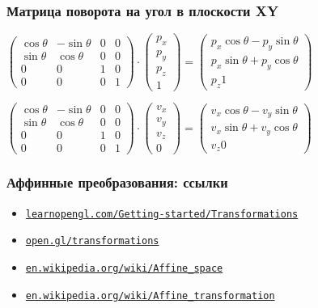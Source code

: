 \documentclass{beamer}
\begin{document}
\begin{frame}[fragile]
\frametitle{Матрица поворота на угол в плоскости XY}
\begin{center}
\begin{math}
\begin{pmatrix}
\cos \theta & - \sin \theta & 0 & 0 \\
\sin \theta & \cos \theta & 0 & 0 \\
0 & 0 & 1 & 0 \\
0 & 0 & 0 & 1
\end{pmatrix}
\cdot
\begin{pmatrix}
p_x \\
p_y \\
p_z \\
1
\end{pmatrix}
=
\begin{pmatrix}
p_x \cos \theta - p_y \sin \theta \\
p_x \sin \theta + p_y \cos \theta \\
p_z
1
\end{pmatrix}
\end{math}

\begin{math}
\begin{pmatrix}
\cos \theta & - \sin \theta & 0 & 0 \\
\sin \theta & \cos \theta & 0 & 0 \\
0 & 0 & 1 & 0 \\
0 & 0 & 0 & 1
\end{pmatrix}
\cdot
\begin{pmatrix}
v_x \\
v_y \\
v_z \\
0
\end{pmatrix}
=
\begin{pmatrix}
v_x \cos \theta - v_y \sin \theta \\
v_x \sin \theta + v_y \cos \theta \\
v_z
0
\end{pmatrix}
\end{math}
\end{center}
\end{frame}

\begin{frame}
\frametitle{Аффинные преобразования: ссылки}
\begin{itemize}
\item \href{https://learnopengl.com/Getting-started/Transformations}{\nolinkurl{learnopengl.com/Getting-started/Transformations}}
\item \href{https://open.gl/transformations}{\nolinkurl{open.gl/transformations}}
\item \href{https://en.wikipedia.org/wiki/Affine_space}{\nolinkurl{en.wikipedia.org/wiki/Affine\_space}}
\item \href{https://en.wikipedia.org/wiki/Affine_transformation}{\nolinkurl{en.wikipedia.org/wiki/Affine\_transformation}}
\end{itemize}
\end{frame}
\end{document}
